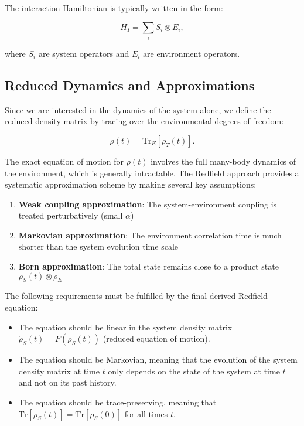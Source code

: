 The interaction Hamiltonian is typically written in the form:

\begin{equation}
	H_I = \sum_i S_i \otimes E_i,
	\label{eq:Interaction_Hamiltonian}
\end{equation}

where $S_i$ are system operators and $E_i$ are environment operators.

\subsection{Reduced Dynamics and Approximations}

Since we are interested in the dynamics of the system alone, we define the reduced density matrix by tracing over the environmental degrees of freedom:

\begin{equation}
	\rho(t) = \mathrm{Tr}_E[\rho_T(t)].
	\label{eq:Reduced_Density_Matrix}
\end{equation}

The exact equation of motion for $\rho(t)$ involves the full many-body dynamics of the environment, which is generally intractable. The Redfield approach provides a systematic approximation scheme by making several key assumptions:

\begin{enumerate}
	\item \textbf{Weak coupling approximation}: The system-environment coupling is treated perturbatively (small $\alpha$)
	\item \textbf{Markovian approximation}: The environment correlation time is much shorter than the system evolution time scale
	\item \textbf{Born approximation}: The total state remains close to a product state $\rho_S(t) \otimes \rho_E$
\end{enumerate}

The following requirements must be fulfilled by the final derived Redfield equation:

\begin{itemize}
	\item The equation should be linear in the system density matrix $\dot{\rho}_S(t) = F(\rho_S(t))$ (reduced equation of motion).
	\item The equation should be Markovian, meaning that the evolution of the system density matrix at time $t$ only depends on the state of the system at time $t$ and not on its past history.
	\item The equation should be trace-preserving, meaning that $\mathrm{Tr}[\rho_S(t)] = \mathrm{Tr}[\rho_S(0)]$ for all times $t$.
\end{itemize}

